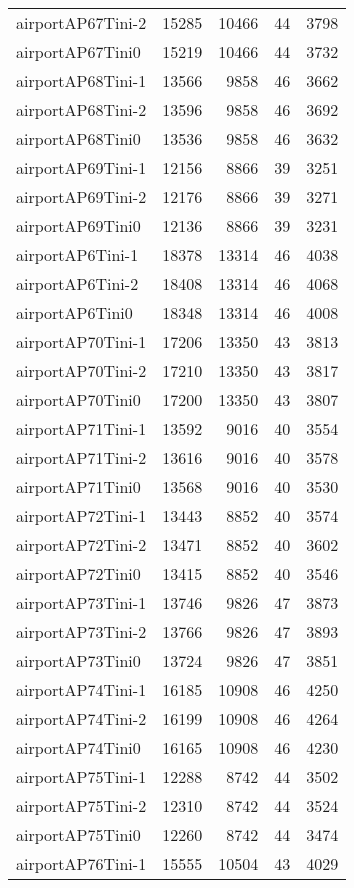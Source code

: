 \begin{longtable}{lrrrr}
airportAP67Tini-2 & 15285 & 10466 & 44 & 3798 \\
airportAP67Tini0 & 15219 & 10466 & 44 & 3732 \\
airportAP68Tini-1 & 13566 & 9858 & 46 & 3662 \\
airportAP68Tini-2 & 13596 & 9858 & 46 & 3692 \\
airportAP68Tini0 & 13536 & 9858 & 46 & 3632 \\
airportAP69Tini-1 & 12156 & 8866 & 39 & 3251 \\
airportAP69Tini-2 & 12176 & 8866 & 39 & 3271 \\
airportAP69Tini0 & 12136 & 8866 & 39 & 3231 \\
airportAP6Tini-1 & 18378 & 13314 & 46 & 4038 \\
airportAP6Tini-2 & 18408 & 13314 & 46 & 4068 \\
airportAP6Tini0 & 18348 & 13314 & 46 & 4008 \\
airportAP70Tini-1 & 17206 & 13350 & 43 & 3813 \\
airportAP70Tini-2 & 17210 & 13350 & 43 & 3817 \\
airportAP70Tini0 & 17200 & 13350 & 43 & 3807 \\
airportAP71Tini-1 & 13592 & 9016 & 40 & 3554 \\
airportAP71Tini-2 & 13616 & 9016 & 40 & 3578 \\
airportAP71Tini0 & 13568 & 9016 & 40 & 3530 \\
airportAP72Tini-1 & 13443 & 8852 & 40 & 3574 \\
airportAP72Tini-2 & 13471 & 8852 & 40 & 3602 \\
airportAP72Tini0 & 13415 & 8852 & 40 & 3546 \\
airportAP73Tini-1 & 13746 & 9826 & 47 & 3873 \\
airportAP73Tini-2 & 13766 & 9826 & 47 & 3893 \\
airportAP73Tini0 & 13724 & 9826 & 47 & 3851 \\
airportAP74Tini-1 & 16185 & 10908 & 46 & 4250 \\
airportAP74Tini-2 & 16199 & 10908 & 46 & 4264 \\
airportAP74Tini0 & 16165 & 10908 & 46 & 4230 \\
airportAP75Tini-1 & 12288 & 8742 & 44 & 3502 \\
airportAP75Tini-2 & 12310 & 8742 & 44 & 3524 \\
airportAP75Tini0 & 12260 & 8742 & 44 & 3474 \\
airportAP76Tini-1 & 15555 & 10504 & 43 & 4029 \\

\end{longtable}
